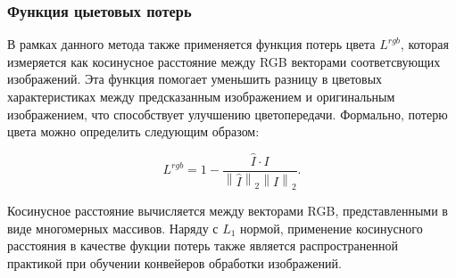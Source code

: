 \subsubsection{Функция цыетовых потерь}

В рамках данного метода также применяется функция потерь цвета $L^{rgb}$, которая измеряется как косинусное расстояние между RGB векторами соответсвующих изображений. Эта функция помогает уменьшить разницу в цветовых характеристиках между предсказанным изображением и оригинальным изображением, что способствует улучшению цветопередачи. Формально, потерю цвета можно определить следующим образом:

\begin{equation}
    \label{eq:2-1-3-4}
    L^{rgb} = 1 - \frac{\hat{I} \cdot I}{\left\|\hat{I}\right\|_2 \left\|I\right\|_2}.
\end{equation}

Косинусное расстояние вычисляется между векторами RGB, представленными в виде многомерных массивов. Наряду с $L_1$ нормой, применение косинусного расстояния в качестве фукции потерь также является распространенной практикой при обучении конвейеров обработки изображений.

